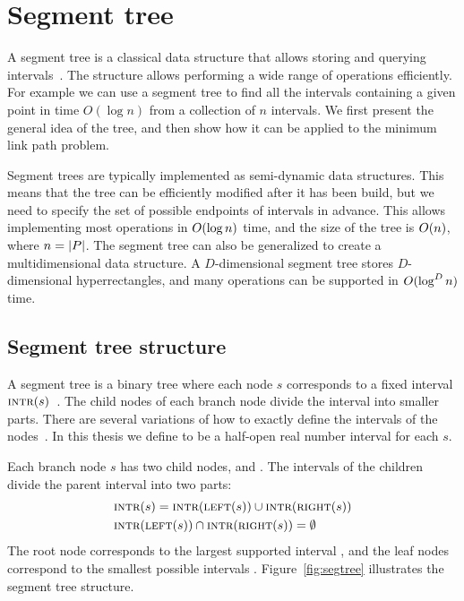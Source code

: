 \documentclass[english,gradu]{tktltiki2018}
\begin{document}
\section{Segment tree}\label{sec:segtree}

A segment tree is a classical data structure that allows storing and querying intervals~\cite{berg2008,wagner}.
The structure allows performing a wide range of operations efficiently.
For example we can use a segment tree to find all the intervals containing a given point in time $O(\log n)$ from a collection of $n$ intervals.
We first present the general idea of the tree, and then show how it can be applied to the minimum link path problem.

Segment trees are typically implemented as semi-dynamic data structures.
This means that the tree can be efficiently modified after it has been build, but we need to specify the set of possible endpoints \epts of intervals in advance.
This allows implementing most operations in $O(\log n)$ time, and the size of the tree is $O(n)$, where $n=\left |P\right |$.
The segment tree can also be generalized to create a multidimensional data structure.
A $D$-dimensional segment tree stores $D$-dimensional hyperrectangles, and many operations can be supported in $O(\log^D n)$ time.

\subsection{Segment tree structure}

A segment tree is a binary tree where each node $s$ corresponds to a fixed interval $\textsc{intr}(s)$~\cite{berg2008}.
The child nodes of each branch node divide the interval into smaller parts.
There are several variations of how to exactly define the intervals of the nodes~\cite{berg2008,kkkk}.
In this thesis we define  to be a half-open real number interval for each $s$.

Each branch node $s$ has two child nodes,  and .
The intervals of the children divide the parent interval into two parts:
\begin{align*}
&\textsc{intr}(s)=\textsc{intr}(\textsc{left}(s))\cup\textsc{intr}(\textsc{right}(s)) \\
&\textsc{intr}(\textsc{left}(s))\cap\textsc{intr}(\textsc{right}(s))=\emptyset
\end{align*}
The root node corresponds to the largest supported interval \range{\epts[1]}{\epts[\segsize]}, and the leaf nodes correspond to the smallest possible intervals \range{\epts[i]}{\epts[i+1]}.
Figure~\ref{fig:segtree} illustrates the segment tree structure.
\end{document}
